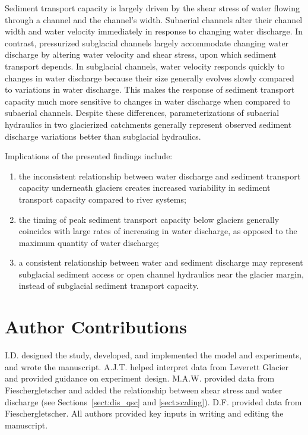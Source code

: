 \documentclass[draft]{agujournal2019}
\begin{document}
Sediment transport capacity is largely driven by the shear stress of water flowing through a channel and the channel's width.
Subaerial channels  alter their channel width and water velocity immediately in response to changing water discharge.
In contrast, pressurized subglacial channels largely accommodate changing water discharge by altering water velocity and shear stress, upon which sediment transport depends.
In subglacial channels, water velocity responds quickly to changes in water discharge because their size generally evolves slowly compared to variations in water discharge.
This makes the response of sediment transport capacity much more sensitive to changes in water discharge when compared to subaerial channels.
Despite these differences, parameterizations of subaerial hydraulics in two glacierized catchments generally represent observed sediment discharge variations better than subglacial hydraulics.

Implications of the presented findings include:
\begin{enumerate}
\item the inconsistent relationship between water discharge and sediment transport capacity underneath glaciers creates increased variability in sediment transport capacity compared to river systems;
\item the timing of peak sediment transport capacity below glaciers generally coincides with large rates of increasing in water discharge, as opposed to the maximum quantity of water discharge;
\item a consistent relationship between water and sediment discharge may represent subglacial sediment access or open channel hydraulics near the glacier margin, instead of subglacial sediment transport capacity.
\end{enumerate}

\section*{Author Contributions}

I.D. designed the study, developed, and implemented the model and experiments, and wrote the manuscript.
A.J.T. helped interpret data from Leverett Glacier and provided guidance on experiment design.
M.A.W. provided data from Fieschergletscher and added the relationship between shear stress and water discharge (see Sections~\ref{sect:dis_qsc} and \ref{sect:scaling}).
D.F. provided data from Fieschergletscher.
All authors provided  key inputs in writing and editing the manuscript.
\end{document}
